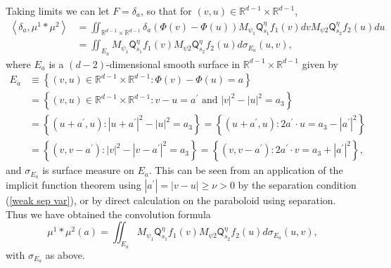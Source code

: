 \documentclass{amsart}%
\theoremstyle{plain}
\numberwithin{equation}{section}
\begin{document}
Taking limits we can let $F=\delta_{a}$, so that for $\left(  v,u\right)
\in\mathbb{R}^{d-1}\times\mathbb{R}^{d-1}$,%
\begin{align*}
\left\langle \delta_{a},\mu^{1}\ast\mu^{2}\right\rangle  & =\iint
_{\mathbb{R}^{d-1}\times\mathbb{R}^{d-1}}\delta_{a}\left(  \Phi\left(
v\right)  -\Phi\left(  u\right)  \right)  M_{\psi_{1}}\mathsf{Q}_{s_{1}}%
^{\eta}f_{1}\left(  v\right)  dvM_{\psi2}\mathsf{Q}_{s_{2}}^{\eta}f_{2}\left(
u\right)  du\\
& =\iint_{E_{a}}M_{\psi_{1}}\mathsf{Q}_{s_{1}}^{\eta}f_{1}\left(  v\right)
M_{\psi2}\mathsf{Q}_{s_{2}}^{\eta}f_{2}\left(  u\right)  d\sigma_{E_{a}%
}\left(  u,v\right)  ,
\end{align*}
where $E_{a}$ is a $\left(  d-2\right)  $-dimensional smooth surface in
$\mathbb{R}^{d-1}\times\mathbb{R}^{d-1}$ given by%
\begin{align*}
E_{a}  & \equiv\left\{  \left(  v,u\right)  \in\mathbb{R}^{d-1}\times
\mathbb{R}^{d-1}:\Phi\left(  v\right)  -\Phi\left(  u\right)  =a\right\} \\
& =\left\{  \left(  v,u\right)  \in\mathbb{R}^{d-1}\times\mathbb{R}%
^{d-1}:v-u=a^{\prime}\text{ and }\left\vert v\right\vert ^{2}-\left\vert
u\right\vert ^{2}=a_{3}\right\} \\
& =\left\{  \left(  u+a^{\prime},u\right)  :\left\vert u+a^{\prime}\right\vert
^{2}-\left\vert u\right\vert ^{2}=a_{3}\right\}  =\left\{  \left(
u+a^{\prime},u\right)  :2a^{\prime}\cdot u=a_{3}-\left\vert a^{\prime
}\right\vert ^{2}\right\} \\
& =\left\{  \left(  v,v-a^{\prime}\right)  :\left\vert v\right\vert
^{2}-\left\vert v-a^{\prime}\right\vert ^{2}=a_{3}\right\}  =\left\{  \left(
v,v-a^{\prime}\right)  :2a^{\prime}\cdot v=a_{3}+\left\vert a^{\prime
}\right\vert ^{2}\right\}  ,
\end{align*}
and $\sigma_{E_{a}}$ is surface measure on $E_{a}$. This can be seen from an
application of the implicit function theorem using $\left\vert a^{\prime
}\right\vert =\left\vert v-u\right\vert \geq\nu>0$ by the separation condition
(\ref{weak sep var}), or by direct calculation on the paraboloid using
separation. Thus we have obtained the convolution formula%
\begin{equation}
\mu^{1}\ast\mu^{2}\left(  a\right)  =\iint_{E_{a}}M_{\psi_{1}}\mathsf{Q}%
_{s_{1}}^{\eta}f_{1}\left(  v\right)  M_{\psi2}\mathsf{Q}_{s_{2}}^{\eta}%
f_{2}\left(  u\right)  d\sigma_{E_{a}}\left(  u,v\right)  ,\label{conv form}%
\end{equation}
with $\sigma_{E_{a}}$ as above.
\end{document}
